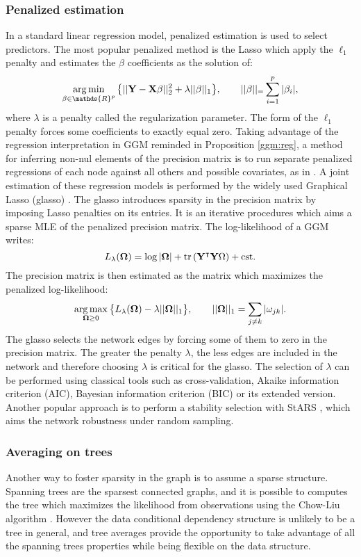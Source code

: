  \subsubsection{Penalized estimation}
 In a standard linear regression model, penalized estimation is used to select predictors. The most popular penalized method is the Lasso \citep{lasso} which apply the $\ell_1$ penalty and estimates the $\beta$ coefficients as the solution of:
 $$\argmin_{\beta \in \mathds{R}^p} \big\{ ||\Yb - \Xb\beta ||^2_2 + \lambda ||\beta||_1\big\}, \qquad ||\beta||_=\sum_{i=1}^p |\beta_i|,$$
 where $\lambda$ is a penalty called the regularization parameter.  The form of the $\ell_1$ penalty forces some coefficients to exactly equal zero. Taking advantage of the regression interpretation in GGM reminded in Proposition \ref{ggm:reg}, a method for inferring non-nul elements of the precision matrix is to run separate penalized regressions of each node against all others and possible covariates, as in \citet{CWL18}. A joint estimation of these regression models is performed by the widely used Graphical Lasso (glasso) \citep{glasso}. The glasso introduces sparsity in the precision matrix by imposing Lasso penalties on its entries. It is an iterative procedures which aims a sparse MLE of the penalized precision matrix.  The log-likelihood of a GGM writes:
 $$L_\lambda({\boldsymbol{\Omega}}) = \log |{\boldsymbol{\Omega}}| +\rm tr\left( {\bf Y}^\intercal {\bf Y} {\boldsymbol{\Omega}} \right)+cst .$$
 The precision matrix is then estimated as the matrix which maximizes the penalized log-likelihood:
 $$\operatorname*{arg\,max}_{{\boldsymbol{\Omega}}\geq 0} \big\{L_\lambda({\boldsymbol{\Omega}}) - \lambda ||{\boldsymbol{\Omega}}||_1\big\}, \qquad ||{\boldsymbol{\Omega}}||_1 = \sum_{j\neq k} |\omega_{jk}|.$$
The glasso  selects the network edges by forcing some of them to zero in the precision matrix. The greater the penalty $\lambda$, the less edges are included in the network and therefore choosing $\lambda$ is critical for the glasso. The selection of $\lambda$ can be performed using classical tools such as cross-validation, Akaike information criterion (AIC),  Bayesian information criterion (BIC) or its extended version.  Another popular approach is to perform a stability selection with StARS \citep{stars}, which aims the network robustness under random sampling.


 
 \subsubsection{Averaging on trees}
  Another way to foster sparsity in the graph is to assume a sparse structure. Spanning trees are the sparsest connected graphs, and it is possible to computes the tree which maximizes the likelihood from observations using  the Chow-Liu algorithm \citep{ChowLiu}. However the data conditional dependency structure is unlikely to be a tree in general, and tree averages provide the opportunity to take advantage of all the spanning trees properties while being flexible on the data structure. \\

